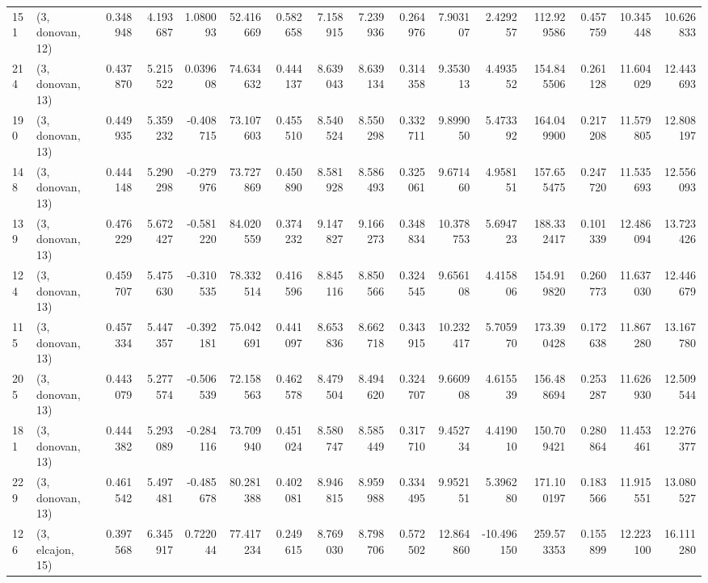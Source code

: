 \begin{tabular}{llrrrrrrrrrrrrrr}
151 &  (3, donovan, 12) &   0.348948 &   4.193687 &  1.080093 &   52.416669 &  0.582658 &   7.158915 &   7.239936 &  0.264976 &   7.903107 &   2.429257 &  112.929586 &  0.457759 &  10.345448 &  10.626833 \\
214 &  (3, donovan, 13) &   0.437870 &   5.215522 &  0.039608 &   74.634632 &  0.444137 &   8.639043 &   8.639134 &  0.314358 &   9.353013 &   4.493552 &  154.845506 &  0.261128 &  11.604029 &  12.443693 \\
190 &  (3, donovan, 13) &   0.449935 &   5.359232 & -0.408715 &   73.107603 &  0.455510 &   8.540524 &   8.550298 &  0.332711 &   9.899050 &   5.473392 &  164.049900 &  0.217208 &  11.579805 &  12.808197 \\
148 &  (3, donovan, 13) &   0.444148 &   5.290298 & -0.279976 &   73.727869 &  0.450890 &   8.581928 &   8.586493 &  0.325061 &   9.671460 &   4.958151 &  157.655475 &  0.247720 &  11.535693 &  12.556093 \\
139 &  (3, donovan, 13) &   0.476229 &   5.672427 & -0.581220 &   84.020559 &  0.374232 &   9.147827 &   9.166273 &  0.348834 &  10.378753 &   5.694723 &  188.332417 &  0.101339 &  12.486094 &  13.723426 \\
124 &  (3, donovan, 13) &   0.459707 &   5.475630 & -0.310535 &   78.332514 &  0.416596 &   8.845116 &   8.850566 &  0.324545 &   9.656108 &   4.415806 &  154.919820 &  0.260773 &  11.637030 &  12.446679 \\
115 &  (3, donovan, 13) &   0.457334 &   5.447357 & -0.392181 &   75.042691 &  0.441097 &   8.653836 &   8.662718 &  0.343915 &  10.232417 &   5.705970 &  173.390428 &  0.172638 &  11.867280 &  13.167780 \\
205 &  (3, donovan, 13) &   0.443079 &   5.277574 & -0.506539 &   72.158563 &  0.462578 &   8.479504 &   8.494620 &  0.324707 &   9.660908 &   4.615539 &  156.488694 &  0.253287 &  11.626930 &  12.509544 \\
181 &  (3, donovan, 13) &   0.444382 &   5.293089 & -0.284116 &   73.709940 &  0.451024 &   8.580747 &   8.585449 &  0.317710 &   9.452734 &   4.419010 &  150.709421 &  0.280864 &  11.453461 &  12.276377 \\
229 &  (3, donovan, 13) &   0.461542 &   5.497481 & -0.485678 &   80.281388 &  0.402081 &   8.946815 &   8.959988 &  0.334495 &   9.952151 &   5.396280 &  171.100197 &  0.183566 &  11.915551 &  13.080527 \\
126 &  (3, elcajon, 15) &   0.397568 &   6.345917 &  0.722044 &   77.417234 &  0.249615 &   8.769030 &   8.798706 &  0.572502 &  12.864860 & -10.496150 &  259.573353 &  0.155899 &  12.223100 &  16.111280 \\

\end{tabular}
